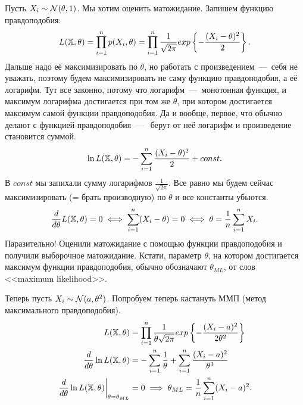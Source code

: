 \documentclass[../TV&MS.tex]{subfiles}
\begin{document}
\begin{Ex}
    Пусть $X_i \sim \mathcal{N}(\theta, 1)$. Мы хотим оценить матожидание.
    Запишем функцию правдоподобия:
    \begin{equation}
        L(\mathbb{X}, \theta) = \prod\limits_{i=1}^{n} p(X_i, \theta) =
        \prod\limits_{i=1}^{n} \frac{1}{\sqrt{2\pi}} exp \left\{ -\frac{(X_i - \theta)^2}{2} \right\}
    .\end{equation} 
    Дальше надо её максимизировать по $\theta$,
    но работать с произведением~---~себя не уважать, 
    поэтому будем максимизировать не саму функцию правдоподобия, а её логарифм.
    Тут все законно, потому что логарифм~---~монотонная функция,
    и максимум логарифма достигается при том же $\theta$, при котором достигается максимум самой функции правдоподобия.
    Да и вообще, первое, что обычно делают с функцией правдоподобия~---~
    берут от неё логарифм и произведение становится суммой.
    \begin{equation}
        \ln{L(\mathbb{X}, \theta)} = 
        - \sum\limits_{i=1}^{n} \frac{(X_i - \theta)^2}{2} + const
    .\end{equation} 
    В $const$ мы запихали сумму логарифмов $\frac{1}{\sqrt{2\pi}}$.
    Все равно мы будем сейчас максимизировать (= брать производную)
    по $\theta$ и все константы убьются.
    \begin{equation}
            \frac{d}{d\theta} L(\mathbb{X}, \theta) = 0 \iff
            \sum\limits_{i=1}^{n} (X_i - \theta) = 0 \iff
            \theta = \frac{1}{n} \sum\limits_{i=1}^{n} X_i
    .\end{equation} 
    Паразительно! Оценили матожидание с помощью функции правдоподобия и получили выборочное матожидание.
    Кстати, параметр $\theta$, на котором достигается максимум функции правдоподобия,
    обычно обозначают $\theta_{ML}$, от слов <<maximum likelihood>>.
\end{Ex} 

\begin{Ex}
    Теперь пусть $X_i \sim \mathcal{N}(a, \theta^2)$.
    Попробуем теперь кастануть ММП (метод максимального правдоподобия).
    \begin{equation}
        \begin{split}
            L(\mathbb{X}, \theta) &= \prod\limits_{i=1}^{n}\frac{1}{\theta\sqrt{2\pi}}  exp \left\{ -\frac{(X_i-a)^2}{2\theta^2} \right\} \\
            \frac{d}{d\theta} \ln{L(\mathbb{X}, \theta)} &=
            -\sum\limits_{i=1}^{n} \frac{1}{\theta} 
            + \sum\limits_{i=1}^{n} \frac{(X_i-a)^2}{\theta^3} \\
            \left. \frac{d}{d\theta} \ln{L(\mathbb{X}, \theta)} \right|_{\theta = \theta_{ML}}&= 0 \implies
            \theta_{ML} = \frac{1}{n} \sum\limits_{i=1}^{n} (X_i - a)^2.
        \end{split} 
    \end{equation} 
\end{Ex} 
\end{document}

